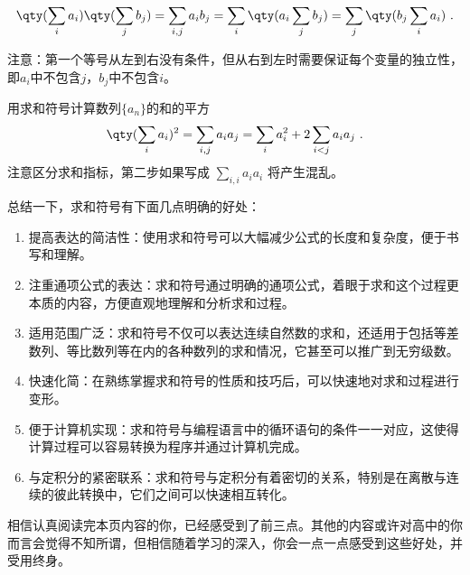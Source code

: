 \begin{equation}
\qty(\sum_i a_i) \qty(\sum_j b_j) = \sum_{i,j} a_i b_j = \sum_i \qty(a_i \sum_j b_j) = \sum_j \qty(b_j \sum_i a_i)~.
\end{equation}

注意：第一个等号从左到右没有条件，但从右到左时需要保证每个变量的独立性，即$a_i$中不包含$j$，$b_j$中不包含$i$。

\begin{example}
{用求和符号计算数列$\{a_n\}$的和的平方}
$$\qty(\sum_i a_i)^2 = \sum_{i,j} a_i a_j = \sum_i a_i^2 + 2\sum_{i<j} a_i a_j~.$$
注意区分求和指标，第二步如果写成 $\sum\limits_{i,i} a_i a_i$ 将产生混乱。
\end{example}

总结一下，求和符号有下面几点明确的好处：

\begin{enumerate}
\item 提高表达的简洁性：使用求和符号可以大幅减少公式的长度和复杂度，便于书写和理解。
\item 注重通项公式的表达：求和符号通过明确的通项公式，着眼于求和这个过程更本质的内容，方便直观地理解和分析求和过程。
\item 适用范围广泛：求和符号不仅可以表达连续自然数的求和，还适用于包括等差数列、等比数列等在内的各种数列的求和情况，它甚至可以推广到无穷级数。
\item 快速化简：在熟练掌握求和符号的性质和技巧后，可以快速地对求和过程进行变形。
\item 便于计算机实现：求和符号与编程语言中的循环语句的条件一一对应，这使得计算过程可以容易转换为程序并通过计算机完成。
\item 与定积分的紧密联系：求和符号与定积分有着密切的关系，特别是在离散与连续的彼此转换中，它们之间可以快速相互转化。
\end{enumerate}

相信认真阅读完本页内容的你，已经感受到了前三点。其他的内容或许对高中的你而言会觉得不知所谓，但相信随着学习的深入，你会一点一点感受到这些好处，并受用终身。